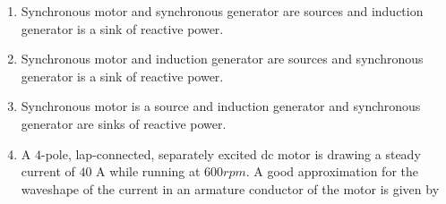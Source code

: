 		\begin{enumerate}
			\item Synchronous motor and synchronous generator are sources and induction generator is a sink of reactive power.
			\item Synchronous motor and induction generator are sources and synchronous generator is a sink of reactive power.
			\item Synchronous motor is a source and induction generator and synchronous generator are sinks of reactive power.
			\item A $4$-pole, lap-connected, separately excited dc motor is drawing a steady current of $40$ A while running at $600 rpm$. A good approximation for the waveshape of the current in an armature conductor of the motor is given by
		\end{enumerate}

